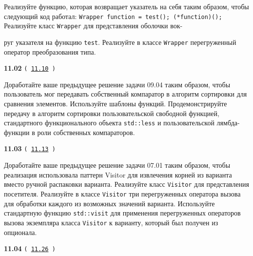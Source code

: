 \documentclass[a4paper,12pt]{article}
\begin{document}
\bigskip

Реализуйте функцию, которая возвращает указатель на себя таким образом, чтобы следующий код работал: \lstinline{Wrapper function = test(); (*function)();} Реализуйте класс \lstinline{Wrapper} для представления оболочки вок- 

руг указателя на функцию \lstinline{test}. Реализуйте в классе \lstinline{Wrapper} перегруженный оператор преобразования типа.

\bigskip

{\large \textbf{11.02} \texttt{(\,\href{https://github.com/i-s-m-mipt/Education/blob/master/projects/examples/source/11.10.cpp}{11.10}\,)}}

\bigskip

Доработайте ваше предыдущее решение задачи 09.04 таким образом, чтобы пользователь мог передавать собственный компаратор в алгоритм сортировки для сравнения элементов. Используйте шаблоны функций. Продемонстрируйте передачу в алгоритм сортировки пользовательской свободной функцией, стандартного функционального объекта \lstinline{std::less} и пользовательской лямбда-функции в роли собственных компараторов.

\bigskip

{\large \textbf{11.03} \texttt{(\,\href{https://github.com/i-s-m-mipt/Education/blob/master/projects/examples/source/11.13.cpp}{11.13}\,)}}

\bigskip

Доработайте ваше предыдущее решение задачи 07.01 таким образом, чтобы реализация использовала паттерн Visitor для извлечения корней из варианта вместо ручной распаковки варианта. Реализуйте класс \lstinline{Visitor} для представления посетителя. Реализуйте в классе \lstinline{Visitor} три перегруженных оператора вызова для обработки каждого из возможных значений варианта. Используйте стандартную функцию \lstinline{std::visit} для применения перегруженных операторов вызова экземпляра класса \lstinline{Visitor} к варианту, который был получен из опционала.

\bigskip

{\large \textbf{11.04} \texttt{(\,\href{https://github.com/i-s-m-mipt/Education/blob/master/projects/examples/source/11.26.cpp}{11.26}\,)}}

\bigskip
\end{document}
